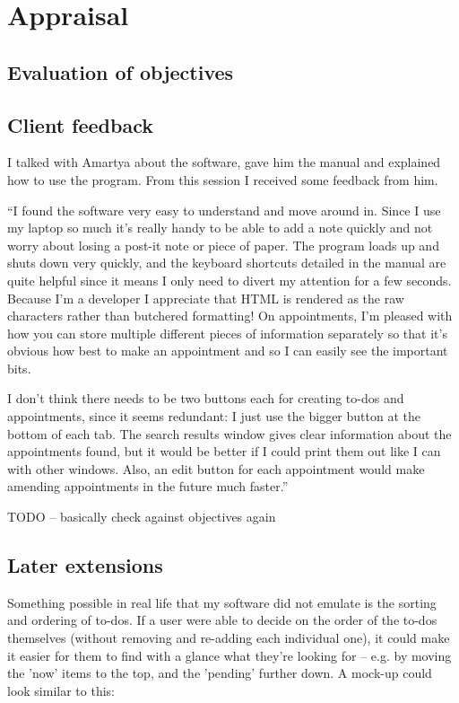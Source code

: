\section{Appraisal}
\subsection{Evaluation of objectives}




\subsection{Client feedback}

I talked with Amartya about the software, gave him the manual and explained how
to use the program. From this session I received some feedback from him.

``I found the software very easy to understand and move around in. Since I use
my laptop so much it's really handy to be able to add a note quickly and not
worry about losing a post-it note or piece of paper. The program loads up and
shuts down very quickly, and the keyboard shortcuts detailed in the manual are
quite helpful since it means I only need to divert my attention for a few
seconds. Because I'm a developer I appreciate that HTML is rendered as the raw
characters rather than butchered formatting! On appointments, I'm pleased with
how you can store multiple different pieces of information separately so that
it's obvious how best to make an appointment and so I can easily see the
important bits.

I don't think there needs to be two buttons each for creating to-dos and
appointments, since it seems redundant: I just use the bigger button at the
bottom of each tab. The search results window gives clear information
about the appointments found, but it would be better if I could print them out
like I can with other windows. Also, an edit button for each appointment would
make amending appointments in the future much faster.''

TODO -- basically check against objectives again


\subsection{Later extensions}

Something possible in real life that my software did not emulate is the sorting
and ordering of to-dos. If a user were able to decide on the order of the to-dos
themselves (without removing and re-adding each individual one), it could make
it easier for them to find with a glance what they're looking for -- e.g. by
moving the 'now' items to the top, and the 'pending' further down. A mock-up
could look similar to this:

